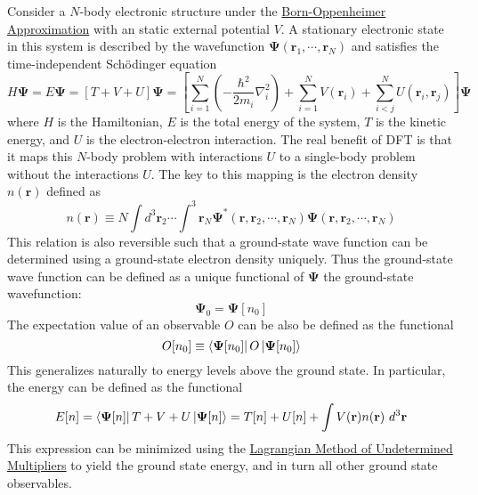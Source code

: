 \documentclass[12pt]{article}
\newcommand{\lrp}[1]{\left( #1 \right)}
\newcommand{\lrb}[1]{\left[ #1 \right]}
\begin{document}
Consider a $N$-body electronic structure under the \href{https://en.wikipedia.org/wiki/Born\%E2\%80\%93Oppenheimer_approximation}{Born-Oppenheimer Approximation} with an static external potential $V$. A stationary electronic state in this system is described by the wavefunction $\boldsymbol{\Psi}(\textbf{r}_1,\cdots,\textbf{r}_N)$ and satisfies the time-independent Sch\"odinger equation
\begin{equation*}
    H\boldsymbol{\Psi} = E\boldsymbol{\Psi} = \lrb{T+V+U}\boldsymbol{\Psi} = \lrb{\sum_{i=1}^N \lrp{-\frac{\hbar^2}{2m_i}\nabla_i^2}+\sum_{i=1}^N V(\textbf{r}_i) + \sum_{i<j}^N U(\textbf{r}_i,\textbf{r}_j)}\boldsymbol{\Psi} 
\end{equation*}
where $H$ is the Hamiltonian, $E$ is the total energy of the system, $T$ is the kinetic energy, and $U$ is the electron-electron interaction. The real benefit of DFT is that it maps this $N$-body problem with interactions $U$ to a single-body problem without the interactions $U$. The key to this mapping is the electron density $n(\textbf{r})$ defined as
\begin{equation*}
    n(\textbf{r}) \equiv N\int d^3\textbf{r}_2 \cdots \int ^3\textbf{r}_N \boldsymbol{\Psi}^*(\textbf{r},\textbf{r}_2,\cdots,\textbf{r}_N)\boldsymbol{\Psi}(\textbf{r},\textbf{r}_2,\cdots,\textbf{r}_N)
\end{equation*}
This relation is also reversible such that a ground-state wave function can be determined using a ground-state electron density uniquely. Thus the ground-state wave function can be defined as a unique functional of $\boldsymbol{\Psi}$ the ground-state wavefunction:
\begin{equation*}
    \boldsymbol{\Psi}_0 = \boldsymbol{\Psi}[n_0]
\end{equation*}
The expectation value of an observable $O$ can be also be defined as the functional
\begin{equation*}
    O[n_0] \equiv \bra{\boldsymbol{\Psi}[n_0]}O\ket{\boldsymbol{\Psi}[n_0]}
\end{equation*}
This generalizes naturally to energy levels above the ground state. In particular, the energy can be defined as the functional
\begin{equation}\label{eq:Enfunc}
    E[n] = \bra{\boldsymbol{\Psi}[n]}T+V+U\ket{\boldsymbol{\Psi}[n]} = T[n] + U[n] + \int V(\textbf{r})n(\textbf{r})~d^3\textbf{r}
\end{equation}
This expression can be minimized using the \href{https://en.wikipedia.org/wiki/Lagrange_multiplier}{Lagrangian Method of Undetermined Multipliers} to yield the ground state energy, and in turn all other ground state observables.
\end{document}
